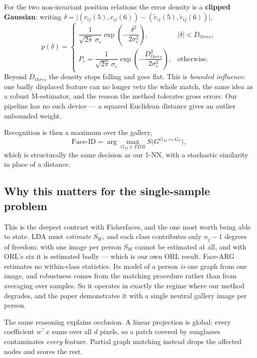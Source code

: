 \documentclass[11pt]{article}
\newcommand{\T}{^{\top}}
\begin{document}
For the two non-invariant position relations the error density is a
\textbf{clipped Gaussian}: writing
$\delta=\bigl|(r_{ij}(5),r_{ij}(6))-(\tilde r_{ij}(5),\tilde r_{ij}(6))\bigr|$,
\begin{equation}
p(\delta)=
\begin{cases}
\dfrac{1}{\sqrt{2\pi}\,\sigma_e}\exp\!\left(-\dfrac{\delta^2}{2\sigma_e^2}\right),
  & |\delta|<D_{thres},\\[2ex]
P_c=\dfrac{1}{\sqrt{2\pi}\,\sigma_e}\exp\!\left(-\dfrac{D_{thres}^2}{2\sigma_e^2}\right),
  & \text{otherwise.}
\end{cases}
\end{equation}
Beyond $D_{thres}$ the density stops falling and goes flat. This is
\emph{bounded influence}: one badly displaced feature can no longer veto the
whole match, the same idea as a robust M-estimator, and the reason the method
tolerates gross errors. Our pipeline has no such device --- a squared Euclidean
distance gives an outlier unbounded weight.

Recognition is then a maximum over the gallery,
\begin{equation}
\text{Face-ID}=\arg\max_{G_M\in FDB}S\bigl(G^{G_M\leftrightarrow G_T}\bigr),
\end{equation}
which is structurally the same decision as our 1-NN, with a stochastic
similarity in place of a distance.

\subsection{Why this matters for the single-sample problem}
This is the deepest contrast with Fisherfaces, and the one most worth being
able to state. LDA must \emph{estimate} $S_W$, and each class contributes only
$n_j-1$ degrees of freedom; with one image per person $S_W$ cannot be estimated
at all, and with ORL's six it is estimated badly --- which is our own ORL
result. Face-ARG estimates no within-class statistics. Its model of a person
\emph{is} one graph from one image, and robustness comes from the matching
procedure rather than from averaging over samples. So it operates in exactly
the regime where our method degrades, and the paper demonstrates it with a
single neutral gallery image per person.

The same reasoning explains occlusion. A linear projection is global: every
coefficient $w\T x$ sums over all $d$ pixels, so a patch covered by sunglasses
contaminates \emph{every} feature. Partial graph matching instead drops the
affected nodes and scores the rest.
\end{document}
